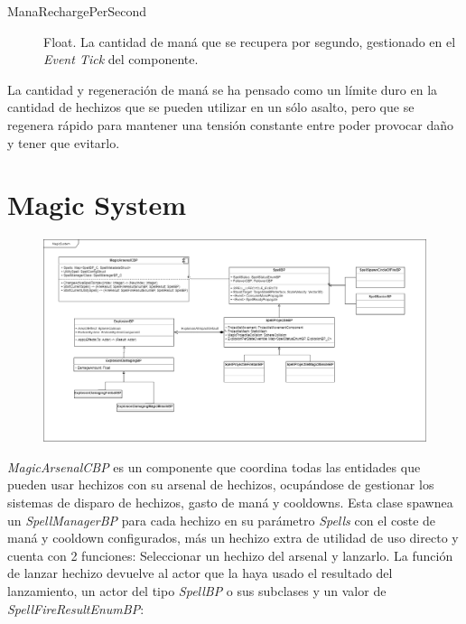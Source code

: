 \documentclass[12pt]{report}
\begin{document}
\begin{description}
	\item[ManaRechargePerSecond] Float. La cantidad de maná que se recupera por segundo, gestionado en el \textit{Event Tick} del componente.
\end{description}

La cantidad y regeneración de maná se ha pensado como un límite duro en la cantidad de hechizos que se pueden utilizar en un sólo asalto, pero que se regenera rápido para mantener una tensión constante entre poder provocar daño y tener que evitarlo.

\section{Magic System}

\begin{figure}[H]
    \centering
    \includegraphics[width=1\textwidth]{magic_system}
\end{figure}

\textit{\emph{MagicArsenalCBP}} es un componente que coordina todas las entidades que pueden usar hechizos con su arsenal de hechizos, ocupándose de gestionar los sistemas de disparo de hechizos, gasto de maná y cooldowns. Esta clase spawnea un \textit{\emph{SpellManagerBP}} para cada hechizo en su parámetro \textit{Spells} con el coste de maná y cooldown configurados, más un hechizo extra de utilidad de uso directo y cuenta con 2 funciones: Seleccionar un hechizo del arsenal y lanzarlo. La función de lanzar hechizo devuelve al actor que la haya usado el resultado del lanzamiento, un actor del tipo \textit{\emph{SpellBP}} o sus subclases y un valor de \textit{\emph{SpellFireResultEnumBP}}:
\end{document}
